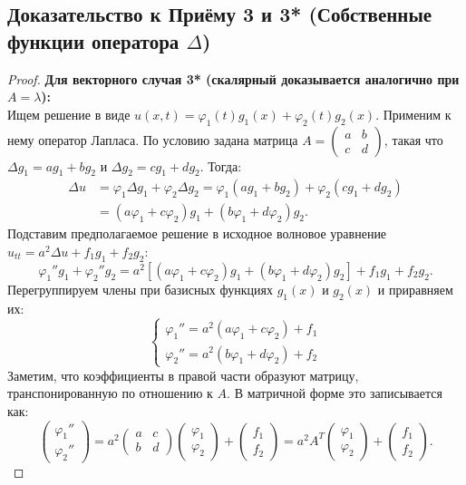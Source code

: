 \documentclass[a4paper,10pt]{article}
\begin{document}
\subsection*{Доказательство к Приёму 3 и 3* (Собственные функции оператора $\Delta$)}
\begin{proof}
\textbf{Для векторного случая 3* (скалярный доказывается аналогично при $A=\lambda$):} \\
Ищем решение в виде $u(x,t) = \varphi_1(t)g_1(x) + \varphi_2(t)g_2(x)$. Применим к нему оператор Лапласа. По условию задана матрица $A = \begin{pmatrix} a & b \\ c & d \end{pmatrix}$, такая что $\Delta g_1 = a g_1 + b g_2$ и $\Delta g_2 = c g_1 + d g_2$. Тогда:
\[
\begin{aligned}
\Delta u &= \varphi_1\Delta g_1 + \varphi_2\Delta g_2 = \varphi_1(ag_1 + bg_2) + \varphi_2(cg_1 + dg_2) \\
&= (a\varphi_1 + c\varphi_2)g_1 + (b\varphi_1 + d\varphi_2)g_2.
\end{aligned}
\]
Подставим предполагаемое решение в исходное волновое уравнение $u_{tt} = a^2 \Delta u + f_1 g_1 + f_2 g_2$:
\[
\varphi_1'' g_1 + \varphi_2'' g_2 = a^2 \left[ (a\varphi_1 + c\varphi_2)g_1 + (b\varphi_1 + d\varphi_2)g_2 \right] + f_1 g_1 + f_2 g_2.
\]
Перегруппируем члены при базисных функциях $g_1(x)$ и $g_2(x)$ и приравняем их:
\[
\begin{cases}
\varphi_1'' = a^2(a\varphi_1 + c\varphi_2) + f_1 \\
\varphi_2'' = a^2(b\varphi_1 + d\varphi_2) + f_2
\end{cases}
\]
Заметим, что коэффициенты в правой части образуют матрицу, транспонированную по отношению к $A$. В матричной форме это записывается как:
\[
\begin{pmatrix} \varphi_1'' \\ \varphi_2'' \end{pmatrix} = a^2 \begin{pmatrix} a & c \\ b & d \end{pmatrix} \begin{pmatrix} \varphi_1 \\ \varphi_2 \end{pmatrix} + \begin{pmatrix} f_1 \\ f_2 \end{pmatrix} = a^2 A^T \begin{pmatrix} \varphi_1 \\ \varphi_2 \end{pmatrix} + \begin{pmatrix} f_1 \\ f_2 \end{pmatrix}.
\]
\end{proof}
\end{document}
